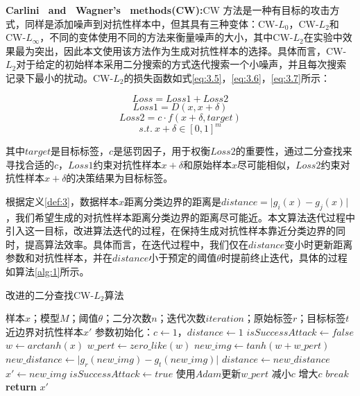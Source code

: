 \noindent\textbf{Carlini \ and \ Wagner's \ methods(CW):}CW \cite{carlini2017towards}方法是一种有目标的攻击方式，同样是添加噪声到对抗性样本中，但其具有三种变体：CW-$L_0$，CW-$L_2$和CW-$L_{\infty}$，不同的变体使用不同的方法来衡量噪声的大小，其中CW-$L_2$在实验中效果最为突出，因此本文使用该方法作为生成对抗性样本的选择。具体而言，CW-$L_2$对于给定的初始样本采用二分搜索的方式迭代搜索一个小噪声，并且每次搜索记录下最小的扰动。CW-$L_2$的损失函数如式\ref{eq:3.5}，\ref{eq:3.6}，\ref{eq:3.7}所示：

\begin{equation}
	\label{eq:3.5}
	Loss = Loss1 + Loss2 
\end{equation}
\begin{equation}
	\label{eq:3.6}
	Loss1 = D(x, x + \delta)
\end{equation}
\begin{equation}
	\label{eq:3.7}
	Loss2 = c \cdot f(x + \delta,target)
\end{equation}
$$s.t. \ x + \delta \in [0,1]^m$$

\noindent 其中$target$是目标标签，$c$是惩罚因子，用于权衡$Loss2$的重要性，通过二分查找来寻找合适的$c$，$Loss1$约束对抗性样本$x + \delta$和原始样本$x$尽可能相似，$Loss2$约束对抗性样本$x + \delta$的决策结果为目标标签。

根据定义\ref{def:3}，数据样本$x$距离分类边界的距离是$distance = \vert g_i(x) - g_j(x) \vert$，我们希望生成的对抗性样本距离分类边界的距离尽可能近。本文算法迭代过程中引入这一目标，改进算法迭代的过程，在保持生成对抗性样本靠近分类边界的同时，提高算法效率。具体而言，在迭代过程中，我们仅在$distance$变小时更新距离参数和对抗性样本，并在$distance$小于预定的阈值$\theta$时提前终止迭代，具体的过程如算法\ref{alg:1}所示。

\begin{algorithm}[H] 
	\caption{改进的二分查找CW-$L_2$算法}
	\label{alg:1}
	\begin{algorithmic}[1]
		
		\Require 样本$x$；模型$M$；阈值$\theta$；二分次数$n$；迭代次数$iteration$；原始标签$r$；目标标签$t$
		\Ensure 近边界对抗性样本$x'$
		\State 参数初始化：$c\gets1$，$distance \gets 1$
			\State $isSuccessAttack \gets false$
			\State $w \gets arctanh(x)$
			\State $w\_pert \gets zero\_like(w)$
				\State $new\_img \gets tanh(w + w\_pert)$
				\State $new\_distance \gets \vert g_r(new\_img) - g_t(new\_img) \vert$
					\State $distance \gets new\_distance$
					\State $x' \gets new\_img$
					\State $isSuccessAttack \gets true$
				\EndIf
				\State 使用$Adam$更新$w\_pert$
			\EndFor
			\State 减小$c$
			\Else \State 增大$c$
			\EndIf 
			\State $break$
			\EndIf
		\EndFor
		\State \textbf{return} $x'$
	\end{algorithmic}
\end{algorithm}



